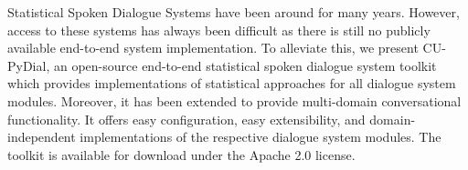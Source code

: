 Statistical Spoken Dialogue Systems have been around for many years. However, access to these systems has always been difficult as there is still no publicly available end-to-end system implementation. To alleviate this, we present CU-PyDial, an open-source end-to-end statistical spoken dialogue system toolkit which provides implementations of statistical approaches for all dialogue system modules. Moreover, it has been extended to provide multi-domain conversational functionality. It offers easy configuration, easy extensibility, and domain-independent implementations of the respective dialogue system modules. The toolkit is available for download under the Apache 2.0 license.
